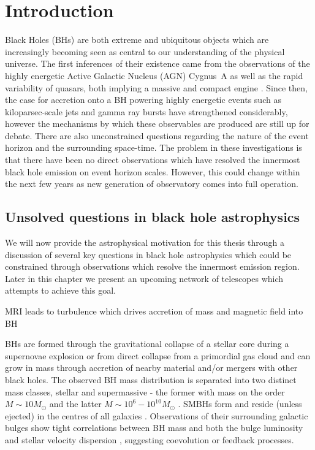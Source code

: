 \chapter{Introduction}
Black Holes (BHs) are both extreme and ubiquitous objects which are increasingly becoming seen as central to our understanding of the physical universe. The first inferences of their existence came from the observations of the highly energetic Active Galactic Nucleus (AGN) Cygnus~A as well as the rapid variability of quasars, both implying a massive and compact engine \citep[e.g.][and references therein]{Narayan_2013}. Since then, the case for accretion onto a BH powering highly energetic events such as kiloparsec-scale jets and gamma ray bursts have strengthened considerably, however the mechanisms by which these observables are produced are still up for debate. There are also unconstrained questions regarding the nature of the event horizon and the surrounding space-time. The problem in these investigations is that there have been no direct observations which have resolved the innermost black hole emission on event horizon scales. However, this could change within the next few years as new generation of observatory comes into full operation.

\section{Unsolved questions in black hole astrophysics}

We will now provide the astrophysical motivation for this thesis through a discussion of several key questions in black hole astrophysics which could be constrained through observations which resolve the innermost emission region. Later in this chapter we present an upcoming network of telescopes which attempts to achieve this goal. 


MRI leads to turbulence which drives accretion of mass and magnetic field into BH

BHs are formed through the gravitational collapse of a stellar core during a supernovae explosion or from direct collapse from a primordial gas cloud and can grow in mass through accretion of nearby material and/or mergers with other black holes. The observed BH mass distribution is separated into two distinct mass classes, stellar and supermassive - the former with mass on the order $M \sim 10 M_\odot$ and the latter $M \sim 10^6 - 10^{10} M_\odot$ \citep{Falcke_2013}. SMBHs form and reside (unless ejected) in the centres of all galaxies \citep{Kormendy_1995}. Observations of their surrounding galactic bulges show tight correlations between BH mass and both the bulge luminosity and stellar velocity dispersion \citep{Magorrian_1998,Gebhardt_2000}, suggesting coevolution or feedback processes. 


